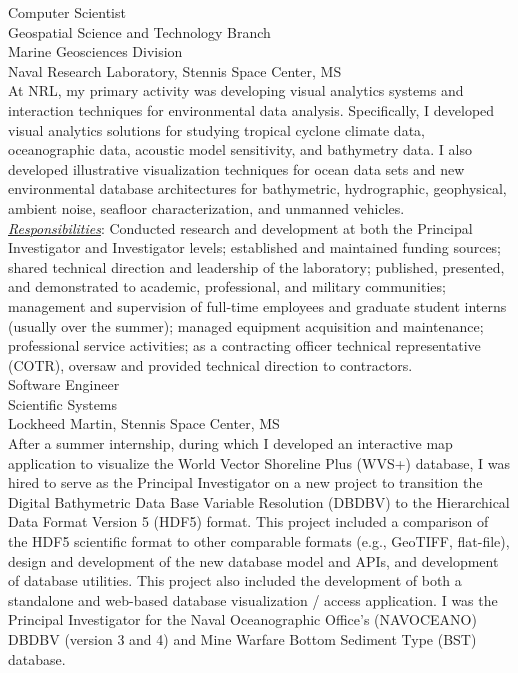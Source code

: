 \documentclass[11pt, letterpaper]{article}
\newcommand{\years}[1]{\marginnote{\scriptsize #1}}
\begin{document}
\years{2001-2010}Computer Scientist\\
Geospatial Science and Technology Branch\\
Marine Geosciences Division\\
Naval Research Laboratory, Stennis Space Center, MS\\[.2cm]
At NRL, my primary activity was developing visual analytics systems and
interaction techniques for environmental data analysis.  Specifically, I
developed visual analytics solutions for studying tropical cyclone climate
data, oceanographic data, acoustic model sensitivity, and bathymetry data.  I
also developed illustrative visualization techniques for ocean data sets and
new environmental database architectures for bathymetric, hydrographic,
geophysical, ambient noise, seafloor characterization, and unmanned vehicles.\\
\emph{\underline{Responsibilities}}:  Conducted research and development at both the
Principal Investigator and Investigator levels; established and maintained
funding sources; shared technical direction and leadership of the
laboratory; published, presented, and demonstrated to academic, professional,
and military communities; management and supervision of full-time employees
and graduate student interns (usually over the summer); managed equipment
acquisition and maintenance; professional service activities; as a contracting
officer technical representative (COTR), oversaw and provided technical
direction to contractors.\\

\years{1999-2001}Software Engineer\\
Scientific Systems\\
Lockheed Martin, Stennis Space Center, MS\\[.2cm]
After a summer internship, during which I developed an
interactive map application to visualize the World Vector Shoreline Plus
(WVS+) database, I was hired to serve as the Principal Investigator on a new
project to transition the Digital Bathymetric Data Base Variable Resolution
(DBDBV) to the Hierarchical Data Format Version 5 (HDF5) format.  This project
included a comparison of the HDF5 scientific format to other comparable
formats (e.g., GeoTIFF, flat-file), design and development of the new database
model and APIs, and development of database utilities.  This project also
included the development of both a standalone and web-based database
visualization / access application.  I was the Principal Investigator for
the Naval Oceanographic Office's (NAVOCEANO) DBDBV (version 3 and 4) and Mine
Warfare Bottom Sediment Type (BST) database.
\end{document}
